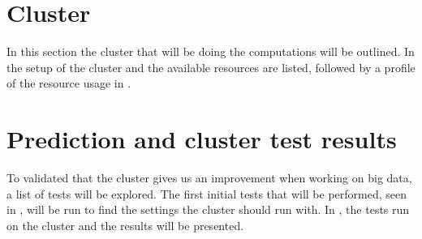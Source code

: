 \documentclass[columns=,boxcolor=white]{datart}
\begin{document}
\section{Cluster}\label{sec:cluster}
In this section the cluster that will be doing the computations will be outlined. In  the setup of the cluster and the available resources are listed, followed by a profile of the resource usage in .






\section{Prediction and cluster test results}\label{sec:testing}
To validated that the cluster gives us an improvement when working on big data, a list of tests will be explored. The first initial tests that will be performed, seen in , will be run to find the settings the cluster should run with. In , the tests run on the cluster and the results will be presented.











\newpage
\appendix

%
%
\end{document}
